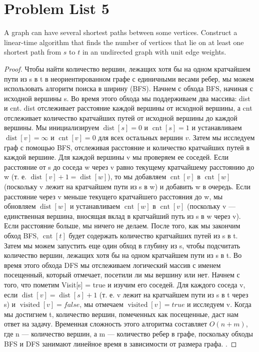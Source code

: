 \section{Problem List 5}

\begin{prob}
A graph can have several shortest paths between some vertices. Construct a linear-time algorithm that finds the number of vertices that lie on at least one shortest path from $s$ to $t$ in an undirected graph with unit edge weights.
\end{prob}
\vskip 0.2in
\begin{proof}
Чтобы найти количество вершин, лежащих хотя бы на одном кратчайшем пути из s в t в неориентированном графе с единичными весами ребер, мы можем использовать алгоритм поиска в ширину (BFS). Начнем с обхода BFS, начиная с исходной вершины s. Во время этого обхода мы поддерживаем два массива: dist и cnt. dist отслеживает расстояние каждой вершины от исходной вершины, а cnt отслеживает количество кратчайших путей от исходной вершины до каждой вершины. Мы инициализируем $\operatorname{dist}[s] = 0$ и $\operatorname{cnt}[s] = 1$ и устанавливаем $\operatorname{dist}[v] = \infty$ и $\operatorname{cnt}[ v] = 0$ для всех остальных вершин $v$. Затем мы исследуем граф с помощью BFS, отслеживая расстояние и количество кратчайших путей в каждой вершине. Для каждой вершины v мы проверяем ее соседей. Если расстояние от s до соседа w через v равно текущему кратчайшему расстоянию до w (т. е. $\operatorname{dist}[v] + 1 = \operatorname{dist}[w]$), то мы добавляем $\operatorname{ cnt}[v]$ в $\operatorname{cnt}[w]$ (поскольку v лежит на кратчайшем пути из s в w) и добавить w в очередь. Если расстояние через v меньше текущего кратчайшего расстояния до w, мы обновляем $\operatorname{dist}[w]$ и устанавливаем $\operatorname{cnt}[w]$ в $\operatorname{cnt}[v]$ (поскольку v — единственная вершина, вносящая вклад в кратчайший путь из s в w через v). Если расстояние больше, мы ничего не делаем. После того, как мы закончим обход BFS, $\operatorname{cnt}[t]$ будет содержать количество кратчайших путей из s в t. Затем мы можем запустить еще один обход в глубину из s, чтобы подсчитать количество вершин, лежащих хотя бы на одном кратчайшем пути из s в t. Во время этого обхода DFS мы отслеживаем логический массив с именем посещенный, который отмечает, посетили ли мы вершину или нет. Начнем с того, что пометим Visit[s] = true и изучим его соседей. Для каждого соседа v, если $\operatorname{dist}[v] = \operatorname{dist}[s] + 1$ (т. е. v лежит на кратчайшем пути из s в t через s) и $\operatorname{visited} [v] = false$, мы отмечаем $\operatorname{visited}[v] = true$ и исследуем v. Когда мы достигнем t, количество вершин, помеченных как посещенные, даст нам ответ на задачу. Временная сложность этого алгоритма составляет $O(n + m)$, где n — количество вершин, а m — количество ребер в графе, поскольку обходы BFS и DFS занимают линейное время в зависимости от размера графа. .
\end{proof}
\vskip 0.6in

